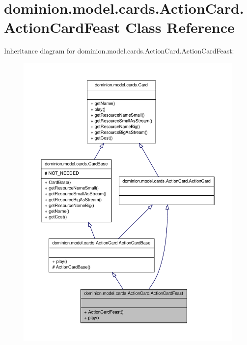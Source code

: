 \hypertarget{classdominion_1_1model_1_1cards_1_1ActionCard_1_1ActionCardFeast}{\section{dominion.\-model.\-cards.\-Action\-Card.\-Action\-Card\-Feast \-Class \-Reference}
\label{classdominion_1_1model_1_1cards_1_1ActionCard_1_1ActionCardFeast}
}


\-Inheritance diagram for dominion.\-model.\-cards.\-Action\-Card.\-Action\-Card\-Feast\-:
\nopagebreak
\begin{figure}[H]
\begin{center}
\leavevmode
\includegraphics[width=350pt]{classdominion_1_1model_1_1cards_1_1ActionCard_1_1ActionCardFeast__inherit__graph}
\end{center}
\end{figure}


